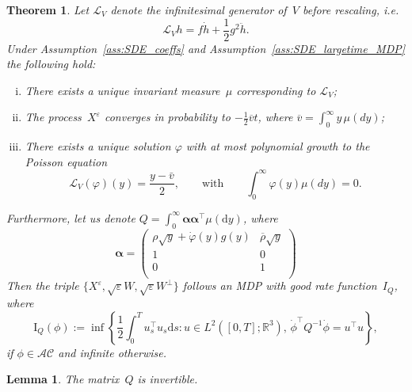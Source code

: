 \documentclass{amsart}[11pt]
\numberwithin{equation}{section}
\newtheorem{theorem}{Theorem}%
\numberwithin{theorem}{subsection}
\numberwithin{proposition}{subsection}
\numberwithin{definition}{subsection}
\newtheorem{lemma}{Lemma}
\numberwithin{lemma}{subsection}
\numberwithin{assumption}{subsection}
\newcommand{\Ll}{\mathcal{L}}
\newcommand{\RR}{\mathbb{R}}
\newcommand{\Wp}{W^{\perp}}
\newcommand{\brho}{\overline{\rho}}
\newcommand{\D}{\mathrm{d}}
\newcommand{\II}{\mathrm{I}}
\newcommand{\eps}{\varepsilon}
\begin{document}
\begin{theorem}\label{thm:limitPoisson}
Let $\Ll_{V}$ denote the infinitesimal generator of~$V$ before rescaling, i.e.
\[
\Ll_V h = f\dot{h} + \frac{1}{2}g^2\ddot{h}.
\]
Under Assumption~\ref{ass:SDE_coeffs} and Assumption~\ref{ass:SDE_largetime_MDP} the following hold:
\begin{enumerate}[i)]
    \item There exists a unique invariant measure~$\mu$ corresponding to $\Ll_V$;
    \item The process~$X^{\eps}$ converges in probability to $-\frac{1}{2}\overline{v}t$, where $\overline{v} = \int_0^\infty y \, \mu(dy)$;
    \item There exists a unique solution $\varphi$ with at most polynomial growth to the Poisson equation
    \[
    \Ll_V(\varphi)(y) = \frac{y - \bar{v}}{2}, 
    \qquad \text{with} \qquad \int_0^\infty \varphi(y)\mu(dy)=0.
    \]
\end{enumerate}
Furthermore, let us denote $ Q=\int_0^\infty\boldsymbol\alpha\boldsymbol\alpha^\top\mu(\D y)$, where
$$
\boldsymbol\alpha =
\begin{pmatrix}
\rho\sqrt{y} + \dot{\varphi}(y)g(y) & \brho\sqrt{y}\\
1 & 0 \\
0 & 1 \\
\end{pmatrix}
$$
Then the triple $\{X^{\eps},\sqrt{\eps}W,\sqrt{\eps}\Wp\}$ follows an MDP with good rate function~$I_{Q}$,
where
$$
\II_{Q}(\phi) := 
\inf \left\{\frac{1}{2}\int_0^T u_s^\top u_s\D s: u\in L^2\left([0,T]; \RR^3\right), \, \dot{\phi}^\top Q^{-1} \dot{\phi} = u^\top u \right\},
$$
if $\phi\in\mathcal{AC}$ and infinite otherwise.
\end{theorem}
\begin{lemma}\label{q-invertible}
The matrix~$Q$ is invertible. 
\end{lemma}
\end{document}
